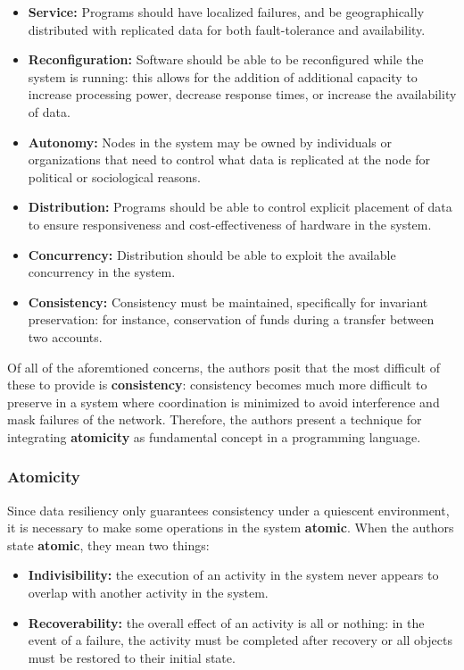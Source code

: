 \begin{itemize}
\item \textbf{Service:} Programs should have localized failures, and be geographically distributed with replicated data for both fault-tolerance and availability.
\item \textbf{Reconfiguration:} Software should be able to be reconfigured while the system is running: this allows for the addition of additional capacity to increase processing power, decrease response times, or increase the availability of data.
\item \textbf{Autonomy:} Nodes in the system may be owned by individuals or organizations that need to control what data is replicated at the node for political or sociological reasons.
\item \textbf{Distribution:} Programs should be able to control explicit placement of data to ensure responsiveness and cost-effectiveness of hardware in the system.
\item \textbf{Concurrency:} Distribution should be able to exploit the available concurrency in the system.
\item \textbf{Consistency:} Consistency must be maintained, specifically for invariant preservation: for instance, conservation of funds during a transfer between two accounts.
\end{itemize}

Of all of the aforemtioned concerns, the authors posit that the most difficult of these to provide is \textbf{consistency}: consistency becomes much more difficult to preserve in a system where coordination is minimized to avoid interference and mask failures of the network.  Therefore, the authors present a technique for integrating \textbf{atomicity} as fundamental concept in a programming language.

\subsubsection{Atomicity}

Since data resiliency only guarantees consistency under a quiescent environment, it is necessary to make some operations in the system \textbf{atomic}.  When the authors state \textbf{atomic}, they mean two things:

\begin{itemize}
\item \textbf{Indivisibility:} the execution of an activity in the system never appears to overlap with another activity in the system.
\item \textbf{Recoverability:} the overall effect of an activity is all or nothing: in the event of a failure, the activity must be completed after recovery or all objects must be restored to their initial state.	
\end{itemize}

